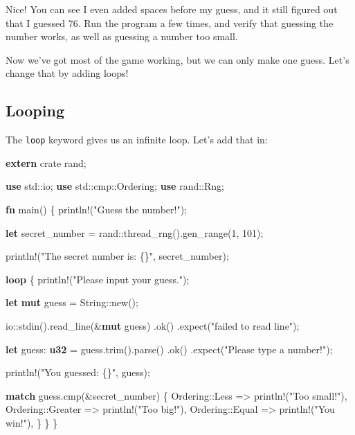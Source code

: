 \documentclass[a4paper,]{book}
\newenvironment{Shaded}{\begin{snugshade}}{\end{snugshade}}
\newcommand{\KeywordTok}[1]{\textcolor[rgb]{0.13,0.29,0.53}{\textbf{{#1}}}}
\newcommand{\DecValTok}[1]{\textcolor[rgb]{0.00,0.00,0.81}{{#1}}}
\newcommand{\StringTok}[1]{\textcolor[rgb]{0.31,0.60,0.02}{{#1}}}
\newcommand{\OtherTok}[1]{\textcolor[rgb]{0.56,0.35,0.01}{{#1}}}
\newcommand{\NormalTok}[1]{{#1}}
\begin{document}
Nice! You can see I even added spaces before my guess, and it still
figured out that I guessed 76. Run the program a few times, and verify
that guessing the number works, as well as guessing a number too small.

Now we've got most of the game working, but we can only make one guess.
Let's change that by adding loops!

\subsection{Looping}\label{looping}

The \texttt{loop} keyword gives us an infinite loop. Let's add that in:

\begin{Shaded}
\begin{Highlighting}[]
\KeywordTok{extern} \NormalTok{crate rand;}

\KeywordTok{use} \NormalTok{std::io;}
\KeywordTok{use} \NormalTok{std::cmp::Ordering;}
\KeywordTok{use} \NormalTok{rand::Rng;}

\KeywordTok{fn} \NormalTok{main() \{}
    \OtherTok{println!}\NormalTok{(}\StringTok{"Guess the number!"}\NormalTok{);}

    \KeywordTok{let} \NormalTok{secret_number = rand::thread_rng().gen_range(}\DecValTok{1}\NormalTok{, }\DecValTok{101}\NormalTok{);}

    \OtherTok{println!}\NormalTok{(}\StringTok{"The secret number is: \{\}"}\NormalTok{, secret_number);}

    \KeywordTok{loop} \NormalTok{\{}
        \OtherTok{println!}\NormalTok{(}\StringTok{"Please input your guess."}\NormalTok{);}

        \KeywordTok{let} \KeywordTok{mut} \NormalTok{guess = String::new();}

        \NormalTok{io::stdin().read_line(&}\KeywordTok{mut} \NormalTok{guess)}
            \NormalTok{.ok()}
            \NormalTok{.expect(}\StringTok{"failed to read line"}\NormalTok{);}

        \KeywordTok{let} \NormalTok{guess: }\KeywordTok{u32} \NormalTok{= guess.trim().parse()}
            \NormalTok{.ok()}
            \NormalTok{.expect(}\StringTok{"Please type a number!"}\NormalTok{);}

        \OtherTok{println!}\NormalTok{(}\StringTok{"You guessed: \{\}"}\NormalTok{, guess);}

        \KeywordTok{match} \NormalTok{guess.cmp(&secret_number) \{}
            \NormalTok{Ordering::Less    => }\OtherTok{println!}\NormalTok{(}\StringTok{"Too small!"}\NormalTok{),}
            \NormalTok{Ordering::Greater => }\OtherTok{println!}\NormalTok{(}\StringTok{"Too big!"}\NormalTok{),}
            \NormalTok{Ordering::Equal   => }\OtherTok{println!}\NormalTok{(}\StringTok{"You win!"}\NormalTok{),}
        \NormalTok{\}}
    \NormalTok{\}}
\NormalTok{\}}
\end{Highlighting}
\end{Shaded}
\end{document}
